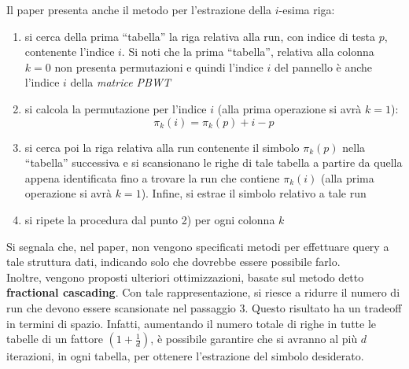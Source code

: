 Il paper presenta anche il metodo per l'estrazione della $i$-esima riga:
\begin{enumerate}
  \item si cerca della prima ``tabella'' la riga relativa alla run, con indice
  di testa $p$, contenente
  l'indice $i$. Si noti che la prima ``tabella'', relativa alla colonna $k=0$
  non presenta permutazioni e quindi 
  l'indice $i$ del pannello è anche l'indice $i$ della \textit{matrice PBWT}
  \item si calcola la permutazione per l'indice $i$ (alla prima operazione
  si avrà $k=1$):
  \begin{equation}
    \label{eq:pbwttrick2}
    \pi_k(i)=\pi_k(p)+i-p
  \end{equation}
  \item si cerca poi la riga relativa alla run contenente il simbolo $\pi_k(p)$
  nella ``tabella'' successiva e si scansionano le righe di tale tabella a
  partire da quella appena identificata fino a trovare la run che contiene
  $\pi_k(i)$ (alla prima
  operazione si avrà $k=1$). Infine, si estrae il simbolo relativo a tale run 
  \item si ripete la procedura dal punto 2) per ogni colonna $k$
\end{enumerate}
Si segnala che, nel paper, non vengono specificati metodi per
effettuare query a 
tale struttura dati, indicando solo che dovrebbe essere possibile farlo.\\
Inoltre,
vengono proposti ulteriori ottimizzazioni, basate sul metodo detto
\textbf{fractional cascading}. Con tale rappresentazione, si riesce a ridurre il
numero di run che devono essere scansionate nel passaggio 3. Questo risultato
ha un tradeoff in termini di spazio. Infatti, aumentando il numero totale di
righe in tutte le tabelle di un fattore $\left(1+\frac{1}{d}\right)$, è
possibile garantire che si avranno al più $d$ iterazioni, in ogni tabella, per
ottenere l'estrazione del simbolo desiderato.
